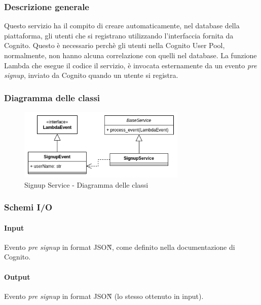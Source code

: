 \subsubsection{Descrizione generale}
Questo servizio ha il compito di creare automaticamente, nel database della piattaforma, gli utenti che
si registrano utilizzando l'interfaccia fornita da Cognito. Questo è necessario perchè gli utenti nella
Cognito User Pool, normalmente, non hanno alcuna correlazione con quelli nel database.
La funzione Lambda che esegue il codice il servizio, è invocata esternamente da un evento \textit{pre signup},
inviato da Cognito quando un utente si registra.

\subsubsection{Diagramma delle classi}
\begin{figure}[H]
    \includegraphics[width=8cm]{sezioni/images/cd_signup.png}
    \centering
    \caption{Signup Service - Diagramma delle classi}
\end{figure}

\subsubsection{Schemi I/O}
\paragraph*{Input}\aCapo{}
Evento \textit{pre signup} in format JSON\G{}, come definito nella documentazione di Cognito.

\paragraph*{Output}\aCapo{}
Evento \textit{pre signup} in format JSON\G{} (lo stesso ottenuto in input).
